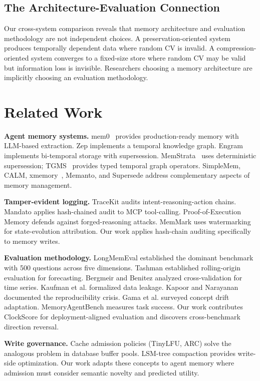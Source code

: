 \documentclass{llncs}
\begin{document}
\subsection{The Architecture-Evaluation Connection}
Our cross-system comparison reveals that memory architecture and evaluation methodology are not independent choices. A preservation-oriented system produces temporally dependent data where random CV is invalid. A compression-oriented system converges to a fixed-size store where random CV may be valid but information loss is invisible. Researchers choosing a memory architecture are implicitly choosing an evaluation methodology.


\section{Related Work}


\textbf{Agent memory systems.} mem0~\cite{mem0} provides production-ready memory with LLM-based extraction. Zep implements a temporal knowledge graph. Engram~\cite{engram} implements bi-temporal storage with supersession. MemStrata~\cite{memstrata} uses deterministic supersession; TGMS~\cite{tgms} provides typed temporal graph operators. SimpleMem, CALM, xmemory~\cite{xmemory}, Memanto, and Supersede address complementary aspects of memory management.

\textbf{Tamper-evident logging.} TraceKit audits intent-reasoning-action chains. Mandato applies hash-chained audit to MCP tool-calling. Proof-of-Execution Memory defends against forged-reasoning attacks. MemMark uses watermarking for state-evolution attribution. Our work applies hash-chain auditing specifically to memory writes.

\textbf{Evaluation methodology.} LongMemEval established the dominant benchmark with 500 questions across five dimensions. Tashman established rolling-origin evaluation for forecasting. Bergmeir and Benitez analyzed cross-validation for time series. Kaufman et al. formalized data leakage. Kapoor and Narayanan documented the reproducibility crisis. Gama et al. surveyed concept drift adaptation. MemoryAgentBench measures task success. Our work contributes ClockScore for deployment-aligned evaluation and discovers cross-benchmark direction reversal.

\textbf{Write governance.} Cache admission policies (TinyLFU, ARC) solve the analogous problem in database buffer pools. LSM-tree compaction provides write-side optimization. Our work adapts these concepts to agent memory where admission must consider semantic novelty and predicted utility.
\end{document}
